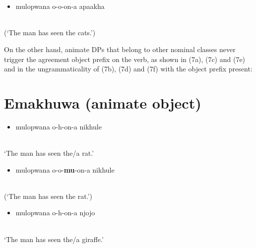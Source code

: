 \documentclass[output=paper]{langsci/langscibook}
\begin{document}
\chapter[]{\rmfamily }
\begin{itemize}
\item \gll *mulopwana         o-o-on-a                         apaakha\\
\end{itemize}
     \\
\glt (‘The man has seen the cats.’)
\z

On the other hand, animate DPs that belong to other nominal classes never trigger the agreement object prefix on the verb, as shown in (7a), (7c) and (7e) and in the ungrammaticality of (7b), (7d) and (7f) with the object prefix  present:

\chapter[Emakhuwa (animate object)]{Emakhuwa (animate object)}
\setcounter{itemize}{0}
\begin{itemize}
\item \gll mulopwana          o-h-on-a                       nikhule\\
\end{itemize}
     \\
\glt ‘The man has seen the/a rat.’
\z

\begin{itemize}
\item \gll *mulopwana        o-o-\textbf{mu}{}-on-a                        nikhule\\
\end{itemize}
     \\
\glt (‘The man has seen the rat.’)
\z

\begin{itemize}
\item \gll mulopwana         o\textup{{}-}h-on-a                       njojo\\
\end{itemize}
     \\
\glt ‘The man has seen the/a giraffe.’
\z
\end{document}
